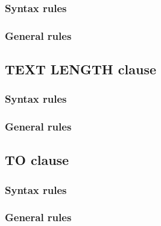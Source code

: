 \begin{syntax}
  \begin{1=}
     \\
     \\
  \end{1=}
  \begin{0-1}
     \\
  \end{0-1}
\end{syntax}

\subsubsection{Syntax rules}

\subsubsection{General rules}

\subsection{TEXT LENGTH clause}

\begin{syntax}[\deletedcolour]
\end{syntax}

\subsubsection{Syntax rules}

\subsubsection{General rules}

\subsection{TO clause}

\begin{syntax}
   \identifier
\end{syntax}

\subsubsection{Syntax rules}

\subsubsection{General rules}

